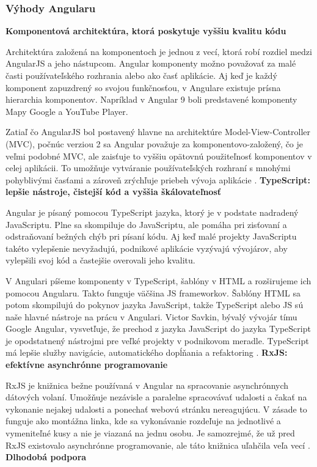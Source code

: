 \newpage

\subsubsection{Výhody Angularu}
\noindent\textbf{Komponentová architektúra, ktorá poskytuje vyššiu kvalitu kódu}

\indent  Architektúra založená na komponentoch je jednou z vecí, ktorá robí rozdiel medzi AngularJS a jeho nástupcom. Angular komponenty možno považovať za malé časti používateľského rozhrania alebo ako časť aplikácie. Aj keď je každý komponent zapuzdrený so svojou funkčnosťou, v Angulare existuje prísna hierarchia komponentov. Napríklad v Angular 9 boli predstavené komponenty Mapy Google a YouTube Player.

\indent Zatiaľ čo AngularJS bol postavený hlavne na architektúre Model-View-Controller (MVC), počnúc verziou 2 sa Angular považuje za komponentovo-založený, čo je veľmi podobné MVC, ale zaisťuje to vyššiu opätovnú použiteľnosť komponentov v celej aplikácii. To umožňuje vytváranie používateľských rozhraní s mnohými pohyblivými časťami a zároveň zrýchľuje priebeh vývoja aplikácie \cite{angular_1}. \newline
\textbf{TypeScript: lepšie nástroje, čistejší kód a vyššia škálovateľnosť}

\indent Angular je písaný pomocou TypeScript jazyka, ktorý je v podstate nadradený JavaScriptu. Plne sa skompiluje do JavaScriptu, ale pomáha pri zisťovaní a odstraňovaní bežných chýb pri písaní kódu. Aj keď malé projekty JavaScriptu takéto vylepšenie nevyžadujú, podnikové aplikácie vyzývajú vývojárov, aby vylepšili svoj kód a častejšie overovali jeho kvalitu.

\indent V Angulari píšeme komponenty v TypeScript, šablóny v HTML a rozširujeme ich pomocou Angularu. Takto funguje väčšina JS frameworkov. Šablóny HTML sa potom skompilujú do pokynov jazyka JavaScript, takže TypeScript alebo JS sú naše hlavné nástroje na prácu v Angulari. Victor Savkin, bývalý vývojár tímu Google Angular, vysvetľuje, že prechod z jazyka JavaScript do jazyka TypeScript je opodstatnený nástrojmi pre veľké projekty v podnikovom meradle. TypeScript má lepšie služby navigácie, automatického dopĺňania a refaktoring \cite{angular_1}.\newline
\textbf{RxJS: efektívne asynchrónne programovanie}

\indent RxJS je knižnica bežne používaná v Angular na spracovanie asynchrónnych dátových volaní. Umožňuje nezávisle a paralelne spracovávať udalosti a čakať na vykonanie nejakej udalosti a ponechať webovú stránku nereagujúcu. V zásade to funguje ako montážna linka, kde sa vykonávanie rozdeľuje na jednotlivé a vymeniteľné kusy a nie je viazaná na jednu osobu. Je samozrejmé, že už pred RxJS existovalo asynchrónne programovanie, ale táto knižnica uľahčila veľa vecí \cite{angular_1}.\newline
\textbf{Dlhodobá podpora}

